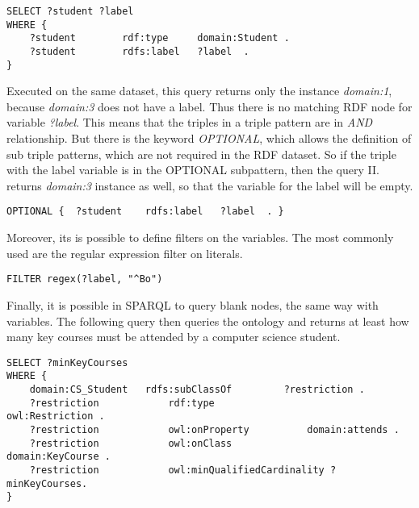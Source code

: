 \newpage
\begin{lstlisting}[captionpos=b, caption=SPARQL Query II., label=2nd:sparql, belowskip=1em, aboveskip=2em,
basicstyle=\footnotesize,frame=single]
SELECT ?student ?label 
WHERE { 
	?student		rdf:type	 domain:Student .	
	?student		rdfs:label	 ?label  .
}
\end{lstlisting}

Executed on the same dataset, this query returns only the instance \textit{domain:1}, because \textit{domain:3} does not have a label. Thus there is no matching RDF node for variable \textit{?label}. This means that the triples in a triple pattern are in \textit{AND} relationship. But there is the keyword \textit{OPTIONAL}, which allows the definition of sub triple patterns, which are not required in the RDF dataset. So if the triple with the label variable is in the OPTIONAL subpattern, then the query II. returns \textit{domain:3} instance as well, so that the variable for the label will be empty.

\begin{lstlisting}[captionpos=b, caption=Optional sub triple pattern., label=2nd:sparql, belowskip=1em, aboveskip=2em,
basicstyle=\footnotesize,frame=single]
OPTIONAL { 	?student	rdfs:label	 ?label  . } 
\end{lstlisting}

Moreover, its is possible to define filters on the variables. The most commonly used are the regular expression filter on literals. 

\begin{lstlisting}[captionpos=b, caption=Regex filter in SPARQL, label=2nd:sparql, belowskip=1em, aboveskip=2em,
basicstyle=\footnotesize,frame=single]
FILTER regex(?label, "^Bo")
\end{lstlisting}

Finally, it is possible in SPARQL to query blank nodes, the same way with variables. The following query then queries the ontology and returns at least how many key courses must be attended by a computer science student.

\newpage
\begin{lstlisting}[captionpos=b, caption=SPARQL Query III., label=3rd:sparql, belowskip=1em, aboveskip=2em,
basicstyle=\footnotesize,frame=single]
SELECT ?minKeyCourses
WHERE {
	domain:CS_Student	rdfs:subClassOf			?restriction .
	?restriction			rdf:type						owl:Restriction .
	?restriction			owl:onProperty			domain:attends .
	?restriction			owl:onClass					domain:KeyCourse .
	?restriction			owl:minQualifiedCardinality	?minKeyCourses.
}
\end{lstlisting}


